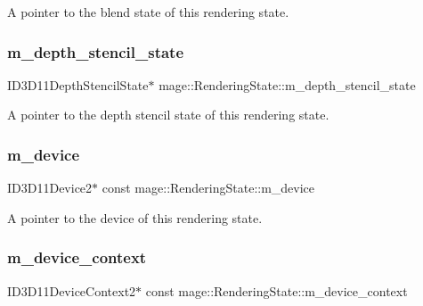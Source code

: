 A pointer to the blend state of this rendering state. \hypertarget{structmage_1_1_rendering_state_a2428412ad160c0d4dd2538c3a9cc863f}{}\label{structmage_1_1_rendering_state_a2428412ad160c0d4dd2538c3a9cc863f} 
\subsubsection{\texorpdfstring{m\+\_\+depth\+\_\+stencil\+\_\+state}{m\_depth\_stencil\_state}}
{\footnotesize\ttfamily I\+D3\+D11\+Depth\+Stencil\+State$\ast$ mage\+::\+Rendering\+State\+::m\+\_\+depth\+\_\+stencil\+\_\+state\hspace{0.3cm}{\ttfamily [private]}}

A pointer to the depth stencil state of this rendering state. \hypertarget{structmage_1_1_rendering_state_a7985712bda141bfac079d4fb6d85cfec}{}\label{structmage_1_1_rendering_state_a7985712bda141bfac079d4fb6d85cfec} 
\subsubsection{\texorpdfstring{m\+\_\+device}{m\_device}}
{\footnotesize\ttfamily I\+D3\+D11\+Device2$\ast$ const mage\+::\+Rendering\+State\+::m\+\_\+device\hspace{0.3cm}{\ttfamily [private]}}

A pointer to the device of this rendering state. \hypertarget{structmage_1_1_rendering_state_a13e46783f38a60fe032dc2aad708ec48}{}\label{structmage_1_1_rendering_state_a13e46783f38a60fe032dc2aad708ec48} 
\subsubsection{\texorpdfstring{m\+\_\+device\+\_\+context}{m\_device\_context}}
{\footnotesize\ttfamily I\+D3\+D11\+Device\+Context2$\ast$ const mage\+::\+Rendering\+State\+::m\+\_\+device\+\_\+context\hspace{0.3cm}{\ttfamily [private]}}


